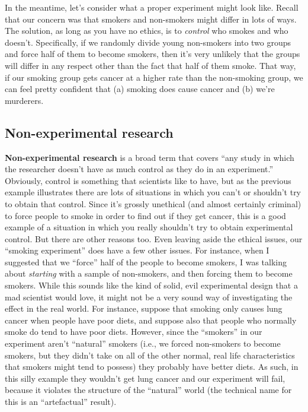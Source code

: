 \documentclass[
]{book}
\begin{document}
In the meantime, let's consider what a proper experiment might look like. Recall that our concern was that smokers and non-smokers might differ in lots of ways. The solution, as long as you have no ethics, is to \emph{control} who smokes and who doesn't. Specifically, if we randomly divide young non-smokers into two groups and force half of them to become smokers, then it's very unlikely that the groups will differ in any respect other than the fact that half of them smoke. That way, if our smoking group gets cancer at a higher rate than the non-smoking group, we can feel pretty confident that (a) smoking does cause cancer and (b) we're murderers.

\hypertarget{non-experimental-research}{%
\subsection{Non-experimental research}\label{non-experimental-research}}

{\textbf{Non-experimental research}} is a broad term that covers ``any study in which the researcher doesn't have as much control as they do in an experiment.'' Obviously, control is something that scientists like to have, but as the previous example illustrates there are lots of situations in which you can't or shouldn't try to obtain that control. Since it's grossly unethical (and almost certainly criminal) to force people to smoke in order to find out if they get cancer, this is a good example of a situation in which you really shouldn't try to obtain experimental control. But there are other reasons too. Even leaving aside the ethical issues, our ``smoking experiment'' does have a few other issues. For instance, when I suggested that we ``force'' half of the people to become smokers, I was talking about \emph{starting} with a sample of non-smokers, and then forcing them to become smokers. While this sounds like the kind of solid, evil experimental design that a mad scientist would love, it might not be a very sound way of investigating the effect in the real world. For instance, suppose that smoking only causes lung cancer when people have poor diets, and suppose also that people who normally smoke do tend to have poor diets. However, since the ``smokers'' in our experiment aren't ``natural'' smokers (i.e., we forced non-smokers to become smokers, but they didn't take on all of the other normal, real life characteristics that smokers might tend to possess) they probably have better diets. As such, in this silly example they wouldn't get lung cancer and our experiment will fail, because it violates the structure of the ``natural'' world (the technical name for this is an ``artefactual'' result).
\end{document}
